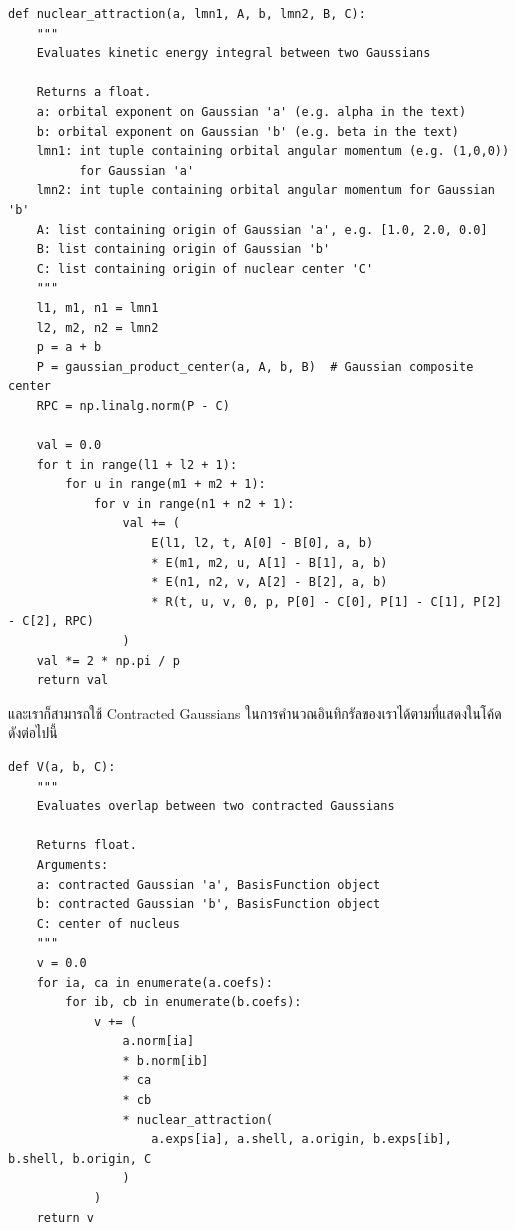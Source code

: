 \begin{lstlisting}[style=MyPython]
def nuclear_attraction(a, lmn1, A, b, lmn2, B, C):
    """
    Evaluates kinetic energy integral between two Gaussians

    Returns a float.
    a: orbital exponent on Gaussian 'a' (e.g. alpha in the text)
    b: orbital exponent on Gaussian 'b' (e.g. beta in the text)
    lmn1: int tuple containing orbital angular momentum (e.g. (1,0,0))
          for Gaussian 'a'
    lmn2: int tuple containing orbital angular momentum for Gaussian 'b'
    A: list containing origin of Gaussian 'a', e.g. [1.0, 2.0, 0.0]
    B: list containing origin of Gaussian 'b'
    C: list containing origin of nuclear center 'C'
    """
    l1, m1, n1 = lmn1
    l2, m2, n2 = lmn2
    p = a + b
    P = gaussian_product_center(a, A, b, B)  # Gaussian composite center
    RPC = np.linalg.norm(P - C)

    val = 0.0
    for t in range(l1 + l2 + 1):
        for u in range(m1 + m2 + 1):
            for v in range(n1 + n2 + 1):
                val += (
                    E(l1, l2, t, A[0] - B[0], a, b)
                    * E(m1, m2, u, A[1] - B[1], a, b)
                    * E(n1, n2, v, A[2] - B[2], a, b)
                    * R(t, u, v, 0, p, P[0] - C[0], P[1] - C[1], P[2] - C[2], RPC)
                )
    val *= 2 * np.pi / p
    return val
\end{lstlisting}

\vspace{5pt}

\noindent และเราก็สามารถใช้ Contracted Gaussians ในการคำนวณอินทิกรัลของเราได้ตามที่แสดงในโค้ดดังต่อไปนี้

\vspace{5pt}

\begin{lstlisting}[style=MyPython]
def V(a, b, C):
    """
    Evaluates overlap between two contracted Gaussians

    Returns float.
    Arguments:
    a: contracted Gaussian 'a', BasisFunction object
    b: contracted Gaussian 'b', BasisFunction object
    C: center of nucleus
    """
    v = 0.0
    for ia, ca in enumerate(a.coefs):
        for ib, cb in enumerate(b.coefs):
            v += (
                a.norm[ia]
                * b.norm[ib]
                * ca
                * cb
                * nuclear_attraction(
                    a.exps[ia], a.shell, a.origin, b.exps[ib], b.shell, b.origin, C
                )
            )
    return v
\end{lstlisting}

